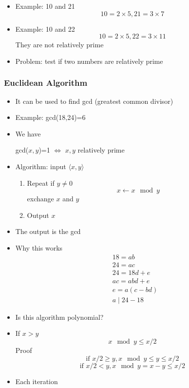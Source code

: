 \begin{frame}[allowframebreaks]
\begin{itemize}
\item Example: 10 and 21
  \begin{equation*}
10=2 \times 5, 21
=3\times 7
\end{equation*}
\item Example: 10 and 22
  \begin{equation*}
10=2 \times 5, 22
=3\times 11
\end{equation*}
They are not relatively prime
\item Problem: test if two numbers are relatively
prime
\end{itemize}\end{frame} \begin{frame}[allowframebreaks] \frametitle{Euclidean Algorithm}
  \begin{itemize}
\item It can be used to find gcd (greatest common divisor)
\item Example:  gcd(18,24)=6
\item We have
  \begin{center}
gcd($x,y$)=1
$\Leftrightarrow$ $x,y$ relatively prime
\end{center}
\item Algorithm: input $\langle  x,y\rangle $
  \begin{enumerate}
  \item Repeat if $y \neq 0$
    \begin{equation*}
x \leftarrow x \mod y
\end{equation*}
exchange $x$ and $y$
\item Output $x$
  \end{enumerate}
\item The output is the gcd
\item Why this works
  \begin{equation*}
    \begin{split}
& 18=ab \\
& 24=ac \\
& 24 = 18d + e \\
& ac=abd + e \\
& e = a (c-bd) \\
& a \mid  24-18
\end{split}
\end{equation*}
\item Is this algorithm polynomial?

\item If $x > y$
\begin{equation*}
  x \mod y \leq x/2
\end{equation*}
Proof
\begin{equation*}
  \mbox{if } x/2 \geq y, x \mod y \leq y \leq x/2
\end{equation*}
\begin{equation*}
  \mbox{if } x/2 < y, x \mod y = x-y \leq x/2
\end{equation*}
\item Each iteration


\end{itemize}
\end{frame}
